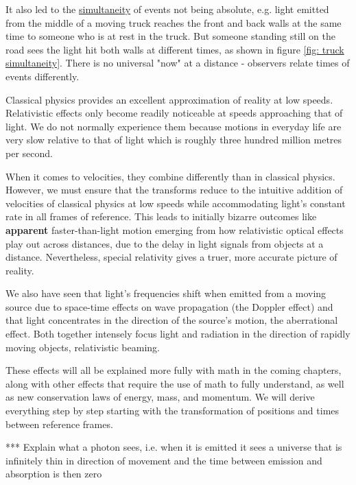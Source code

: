 It also led to the \hyperlink{def-simultaneity}{simultaneity} of events not being absolute, e.g. light emitted from the middle of a moving truck reaches the front and back walls at the same time to someone who is at rest in the truck. But someone standing still on the road sees the light hit both walls at different times, as shown in figure \ref{fig: truck simultaneity}. There is no universal "now" at a distance - observers relate times of events differently.

Classical physics provides an excellent approximation of reality at low speeds. Relativistic effects only become readily noticeable at speeds approaching that of light. We do not normally experience them because motions in everyday life are very slow relative to that of light which is roughly three hundred million metres per second.

When it comes to velocities, they combine differently than in classical physics. However, we must ensure that the transforms reduce to the intuitive addition of velocities of classical physics at low speeds while accommodating light's constant rate in all frames of reference. This leads to initially bizarre outcomes like \textbf{apparent} faster-than-light motion emerging from how relativistic optical effects play out across distances, due to the delay in light signals from objects at a distance. Nevertheless, special relativity gives a truer, more accurate picture of reality.

We also have seen that light's frequencies shift when emitted from a moving source due to space-time effects on wave propagation (the Doppler effect) and that light concentrates in the direction of the source's motion, the aberrational effect. Both together intensely focus light and radiation in the direction of rapidly moving objects, relativistic beaming.

These effects will all be explained more fully with math in the coming chapters, along with other effects that require the use of math to fully understand, as well as new conservation laws of energy, mass, and momentum. We will derive everything step by step starting with the transformation of positions and times between reference frames.

*** Explain what a photon sees, i.e. when it is emitted it sees a universe that is infinitely thin in direction of movement and the time between emission and absorption is then zero



